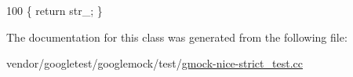 \begin{DoxyCode}
100 \{ \textcolor{keywordflow}{return} str\_; \}
\end{DoxyCode}


The documentation for this class was generated from the following file\+:\begin{DoxyCompactItemize}
\item 
vendor/googletest/googlemock/test/\hyperlink{gmock-nice-strict__test_8cc}{gmock-\/nice-\/strict\+\_\+test.\+cc}\end{DoxyCompactItemize}
